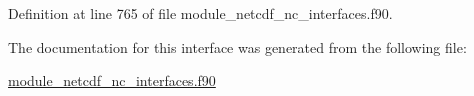 Definition at line 765 of file module\+\_\+netcdf\+\_\+nc\+\_\+interfaces.\+f90.



The documentation for this interface was generated from the following file\+:\begin{DoxyCompactItemize}
\item 
\hyperlink{module__netcdf__nc__interfaces_8f90}{module\+\_\+netcdf\+\_\+nc\+\_\+interfaces.\+f90}\end{DoxyCompactItemize}
